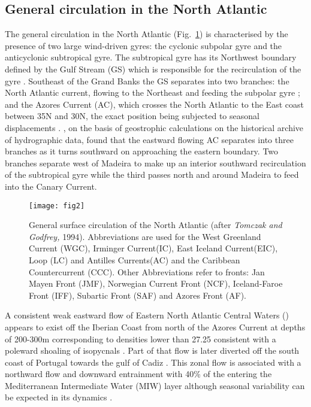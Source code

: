 \subsection{General circulation in the North Atlantic} The general
circulation in the North Atlantic (Fig.~\ref{fig:gencirc}) is
characterised by the presence of two large wind-driven gyres: the
cyclonic subpolar gyre and the anticyclonic subtropical gyre. The
subtropical gyre has its Northwest boundary defined by the Gulf
Stream (GS) which is responsible for the recirculation of the gyre
\citep{Dietrich75}. Southeast of the Grand Banks the GS separates
into two branches: the North Atlantic current, flowing to the
Northeast and feeding the subpolar gyre \citep{Clarke80,Sy88}; and
the Azores Current (AC), which crosses the North Atlantic to the
East coast between 35\deg N and 30\deg N, the exact position being
subjected to seasonal displacements \citep{Tokmakian93}.
\citet{Stramma84}, on the basis of geostrophic calculations on the
historical archive of hydrographic data, found that the eastward
flowing AC separates into three branches as it turns southward on
approaching the eastern boundary. Two branches separate west of
Madeira to make up an interior southward recirculation of the
subtropical gyre while the third passes north and around Madeira
to feed into the Canary Current.
\begin{figure}
  \centering
  \texttt{[image: fig2]}
  \caption{General surface circulation of the North Atlantic
  (after {\it Tomczak and Godfrey,} 1994). Abbreviations are used for
  the West Greenland Current (WGC), Irminger Current(IC), East
  Iceland Current(EIC), Loop (LC) and Antilles Currents(AC) and
  the Caribbean Countercurrent (CCC). Other Abbreviations refer to
  fronts:  Jan Mayen Front (JMF), Norwegian Current Front (NCF),
  Iceland-Faroe Front (IFF), Subartic Front (SAF) and Azores Front
  (AF).}\label{fig:gencirc}
\end{figure}

A consistent weak eastward flow of Eastern North Atlantic Central
Waters (\enaw) appears to exist off the Iberian Coast from north
of the Azores Current at depths of 200-300m corresponding to
densities lower than 27.25
\citep{Saunders82,Pollard85,Arhan94,Maze97} consistent with a
poleward shoaling of isopycnals \citep{Barton02}. Part of that
flow is later diverted off the south coast of Portugal towards the
gulf of Cadiz \citep{Maze97}. This zonal flow is associated with a
northward flow and downward entrainment with  40\% of the \enaw
entering the Mediterranean Intermediate Water (MIW) layer
\citep{Maze97} although seasonal variability can be expected in
its dynamics \citep{Saunders82,Arhan94}.

